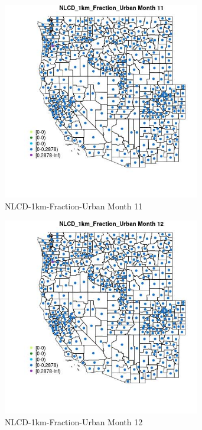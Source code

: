 \begin{figure} 
\centering  
\includegraphics[width=0.77\textwidth]{Code_Outputs/df_report_ML_predictors_CountyCentroid_Locations_Dates_2008-01-01to2018-12-31_MapObsMo11NLCD_1km_Fraction_Urban.jpg} 
\caption{\label{fig:df_report_ML_predictors_CountyCentroid_Locations_Dates_2008-01-01to2018-12-31MapObsMo11NLCD_1km_Fraction_Urban}NLCD-1km-Fraction-Urban Month 11} 
\end{figure} 
 

\begin{figure} 
\centering  
\includegraphics[width=0.77\textwidth]{Code_Outputs/df_report_ML_predictors_CountyCentroid_Locations_Dates_2008-01-01to2018-12-31_MapObsMo12NLCD_1km_Fraction_Urban.jpg} 
\caption{\label{fig:df_report_ML_predictors_CountyCentroid_Locations_Dates_2008-01-01to2018-12-31MapObsMo12NLCD_1km_Fraction_Urban}NLCD-1km-Fraction-Urban Month 12} 
\end{figure} 
 

